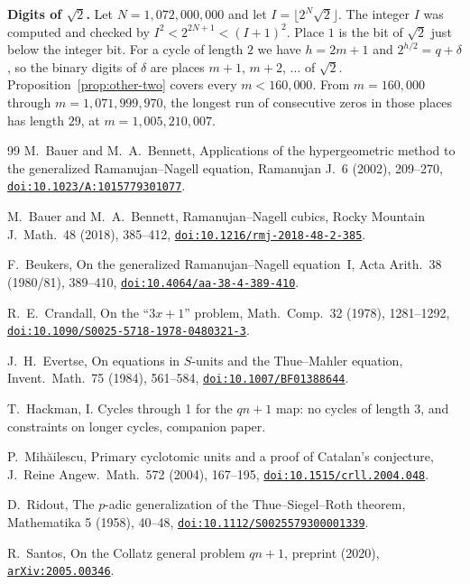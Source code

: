 \documentclass[11pt]{article}
\newcommand{\doilink}[1]{\href{https://doi.org/#1}{\nolinkurl{doi:#1}}}
\newcommand{\topic}[1]{\par\noindent\textbf{#1}}
\begin{document}
\topic{Digits of $\sqrt{2}$.}
Let $N = 1{,}072{,}000{,}000$ and let $I = \lfloor 2^N \sqrt{2} \rfloor$.
The integer $I$ was computed and checked by $I^2 < 2^{2N+1} < (I+1)^2$.
Place $1$ is the bit of $\sqrt{2}$ just below the integer bit.
For a cycle of length $2$ we have $h = 2m + 1$ and $2^{h/2} = q + \delta$, so the binary digits of $\delta$ are places $m+1$, $m+2$, $\ldots$ of $\sqrt{2}$.
Proposition~\ref{prop:other-two} covers every $m < 160{,}000$.
From $m = 160{,}000$ through $m = 1{,}071{,}999{,}970$, the longest run of consecutive zeros in those places has length $29$, at $m = 1{,}005{,}210{,}007$.

\begin{thebibliography}{99}
M.~Bauer and M.~A.~Bennett, Applications of the hypergeometric method to the generalized Ramanujan--Nagell equation, Ramanujan J.\ 6 (2002), 209--270, \doilink{10.1023/A:1015779301077}.

M.~Bauer and M.~A.~Bennett, Ramanujan--Nagell cubics, Rocky Mountain J.\ Math.\ 48 (2018), 385--412, \doilink{10.1216/rmj-2018-48-2-385}.

F.~Beukers, On the generalized Ramanujan--Nagell equation~I, Acta Arith.\ 38 (1980/81), 389--410, \doilink{10.4064/aa-38-4-389-410}.

R.~E.~Crandall, On the ``$3x+1$'' problem, Math.\ Comp.\ 32 (1978), 1281--1292, \doilink{10.1090/S0025-5718-1978-0480321-3}.

J.~H.~Evertse, On equations in $S$-units and the Thue--Mahler equation, Invent.\ Math.\ 75 (1984), 561--584, \doilink{10.1007/BF01388644}.

T.~Hackman, I. Cycles through 1 for the $qn+1$ map: no cycles of length $3$, and constraints on longer cycles, companion paper.

P.~Mihăilescu, Primary cyclotomic units and a proof of Catalan's conjecture, J.~Reine Angew.~Math.~572 (2004), 167--195, \doilink{10.1515/crll.2004.048}.

D.~Ridout, The $p$-adic generalization of the Thue--Siegel--Roth theorem, Mathematika 5 (1958), 40--48, \doilink{10.1112/S0025579300001339}.

R.~Santos, On the Collatz general problem $qn+1$, preprint (2020), \href{https://arxiv.org/abs/2005.00346}{\nolinkurl{arXiv:2005.00346}}.

\end{thebibliography}
\end{document}
